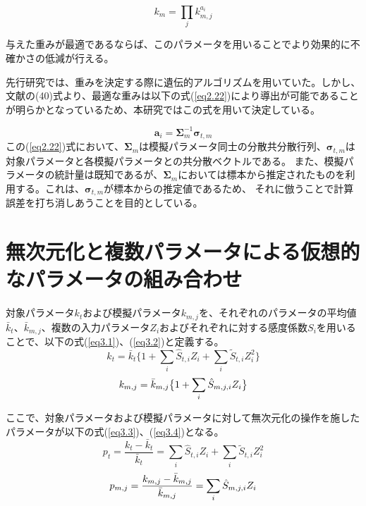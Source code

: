 \documentclass[a4paper,11pt,titlepage,uplatex]{jsreport}
\begin{document}
\begin{equation}
  k_m = \prod_{j} k_{m,j}^{a_i}
  \label{eq2.21}
\end{equation}

与えた重みが最適であるならば、このパラメータを用いることでより効果的に不確かさの低減が行える。

先行研究では、重みを決定する際に遺伝的アルゴリズムを用いていた\cite{kida2022aki}。しかし、文献\cite{kugo2007theoretical}の(40)式より、最適な重みは以下の式(\ref{eq2.22})により導出が可能であることが明らかとなっているため、本研究ではこの式を用いて決定している。

\begin{equation}
  \bm{a}_i = \bm{\Sigma}_m^{-1} \bm{\sigma}_{t,m}
  \label{eq2.22}
\end{equation}
この(\ref{eq2.22})式において、$\bm{\Sigma}_m$は模擬パラメータ同士の分散共分散行列、$\bm{\sigma}_{t,m}$は対象パラメータと各模擬パラメータとの共分散ベクトルである。
また、模擬パラメータの統計量は既知であるが、$\bm{\Sigma}_m$においては標本から推定されたものを利用する。これは、$\bm{\sigma}_{t,m}$が標本からの推定値であるため、
それに倣うことで計算誤差を打ち消しあうことを目的としている。

\section{無次元化と複数パラメータによる仮想的なパラメータの組み合わせ}
対象パラメータ$k_t$および模擬パラメータ$k_{m,j}$を、それぞれのパラメータの平均値$\bar{k}_t$、$\bar{k}_{m,j}$、複数の入力パラメータ$Z_i$およびそれぞれに対する感度係数$S_i$を用いることで、以下の式(\ref{eq3.1})、(\ref{eq3.2})と定義する。
\begin{equation}
  k_{t} = \bar{k}_t \bigl\{ 1 + \sum_{i}\hat{S}_{t,i} Z_i + \sum_{i}\tilde{S}_{t,i} Z_i^2 \bigr\}
  \label{eq3.1}
\end{equation}
\begin{equation}
  k_{m,j} = \bar{k}_{m,j} \bigl\{ 1 + \sum_{i}\Hat{S}_{m,j,i} Z_i  \bigr\}
  \label{eq3.2}
\end{equation}

ここで、対象パラメータおよび模擬パラメータに対して無次元化の操作を施したパラメータが以下の式(\ref{eq3.3})、(\ref{eq3.4})となる。
\begin{equation}
  p_t = \frac{k_{t}-\bar{k}_t}{\bar{k}_t} = \sum_{i}\hat{S}_{t,i} Z_i + \sum_{i}\tilde{S}_{t,i} Z_i^2 
  \label{eq3.3}
\end{equation}
\begin{equation}
  p_{m,j} = \frac{k_{m,j}-\bar{k}_{m,j}}{\bar{k}_{m,j}} = \sum_{i}\Hat{S}_{m,j,i} Z_i
  \label{eq3.4}
\end{equation}
\end{document}
